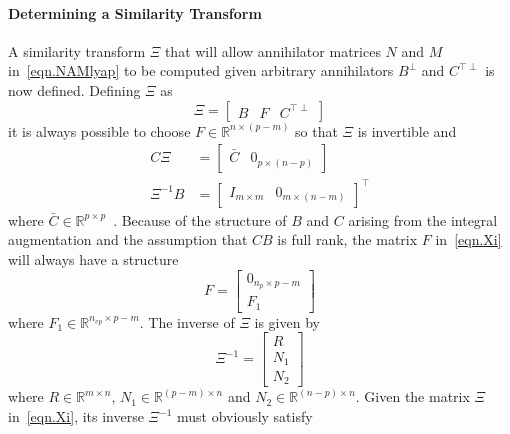 \paragraph{Determining a Similarity Transform}
A similarity transform $\Xi$ that will allow annihilator matrices $N$ and $M$ in\ \eqref{eqn.NAMlyap} to be computed given arbitrary annihilators $B^{\perp}$ and $C^{\top\perp}$ is now defined.
Defining $\Xi$ as
\begin{equation}
  \label{eqn.Xi}
  \Xi=
  \begin{bmatrix}
    B & F & C^{\top\perp}
  \end{bmatrix}
\end{equation}
it is always possible to choose $F\in\mathbb{R}^{n\times(p-m)}$ so that $\Xi$ is invertible and
\begin{equation}
  \label{eqn.XiSatisfies}
  \begin{split}
    C\Xi&=
    \begin{bmatrix}
      \bar{C} & 0_{p\times(n-p)}
    \end{bmatrix} \\
    \Xi^{-1}B&=
    \begin{bmatrix}
      I_{m\times m} & 0_{m\times(n-m)}
    \end{bmatrix}^{\top}
  \end{split}
\end{equation}
where $\bar{C}\in\mathbb{R}^{p\times p}$\ \cite{owens.invariant.1977}.
Because of the structure of $B$ and $C$ arising from the integral augmentation and the assumption that $CB$ is full rank, the matrix $F$ in\ \eqref{eqn.Xi} will always have a structure
\begin{equation}
  \label{eqn.F1}
  F =
  \begin{bmatrix}
    0_{n_{p}\times p-m} \\
    F_{1}
  \end{bmatrix}
\end{equation}
where $F_{1}\in\mathbb{R}^{n_{ep}\times p-m}$.
The inverse of $\Xi$ is given by
\begin{equation}
  \label{eqn.Xiinv}
  \Xi^{-1}=
  \begin{bmatrix}
    R \\
    N_{1} \\
    N_{2}
  \end{bmatrix}
\end{equation}
where $R\in\mathbb{R}^{m\times n}$, $N_{1}\in\mathbb{R}^{(p-m)\times n}$ and $N_{2}\in\mathbb{R}^{(n-p)\times n}$.
Given the matrix $\Xi$ in\ \eqref{eqn.Xi}, its inverse $\Xi^{-1}$ must obviously satisfy
